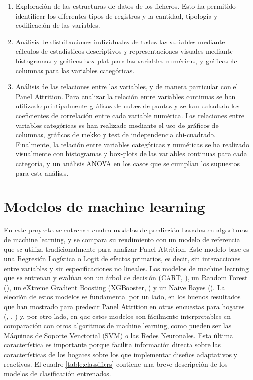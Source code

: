 \begin{enumerate}[noitemsep]
    \item Exploración de las estructuras de datos de los ficheros. Esto ha permitido identificar los diferentes tipos de registros y la cantidad, tipología y codificación de las variables.
    \item Análisis de distribuciones individuales de todas las variables mediante cálculos de estadísticos descriptivos y representaciones visuales mediante histogramas y gráficos box-plot para las variables numéricas, y gráficos de columnas para las variables categóricas.
    \item Análisis de las relaciones entre las variables, y de manera particular con el Panel Attrition. Para analizar la relación entre variables continuas se han utilizado printipalmente gráficos de nubes de puntos y se han calculado los coeficientes de correlación entre cada variable numérica. Las relaciones entre variables categóricas se han realizado mediante el uso de gráficos de columnas, gráficos de mekko y test de independencia chi-cuadrado. Finalmente, la relación entre variables categóricas y numéricas se ha realizado visualmente con histogramas y box-plots de las variables continuas para cada categoría, y un análisis ANOVA en los casos que se cumplían los supuestos para este análisis.
\end{enumerate}

\section{Modelos de machine learning}

En este proyecto se entrenan cuatro modelos de predicción basados en algoritmos de machine learning, y se compara su rendimiento con un modelo de referencia que se utiliza tradicionalmente para analizar Panel Attrition. Este modelo base es una Regresión Logística o Logit de efectos primarios, es decir, sin interacciones entre variables y sin especificaciones no lineales. Los modelos de machine learning que se entrenan y evalúan son un árbol de decisión (CART, \cite{breiman1984cart}), un Random Forest (\cite{breiman2001random}), un eXtreme Gradient Boosting (XGBooster, \cite{chen2016xgboost}) y un Naive Bayes (\cite{webb2010naive}). La elección de estos modelos se fundamenta, por un lado, en los buenos resultados que han mostrado para predecir Panel Attrition en otras encuestas para hogares (\cite{kern2019tree}, \cite{kern2021predicting}, \cite{beste2023case}) y, por otro lado, en que estos modelos son fácilmente interpretables en comparación con otros algoritmos de machine learning, como pueden ser las Máquinas de Soporte Venctorial (SVM) o las Redes Neuronales. Esta última característica es importante porque facilita información directa sobre las características de los hogares sobre los que implementar diseños adaptativos y reactivos. El cuadro \ref{table:classifiers} contiene una breve descripción de los modelos de clasificación entrenados.

